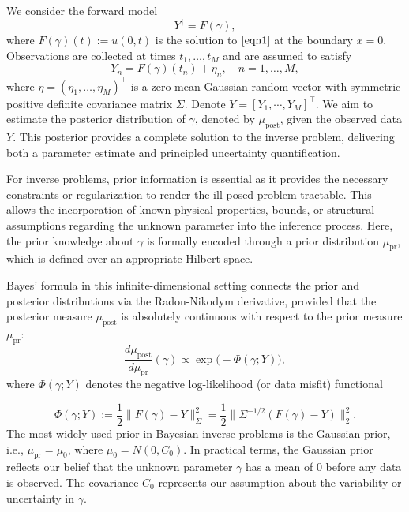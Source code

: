 \documentclass{ws-mplb}
\begin{document}
We consider the forward model
\[
Y^{\dagger} = F(\gamma),
\]
where \( F(\gamma)(t) := u(0, t) \) is the solution to $\eqref{eqn1}$ at the boundary $x=0$. 
Observations are collected at times \( t_1, \dots, t_M \) and are assumed to satisfy
\begin{equation}\label{eqndata}
Y_n = F(\gamma)(t_n) + \eta_n,\quad n=1,\dots,M,
\end{equation}
where \( \eta = (\eta_1, \dots, \eta_M)^\top \) is a zero-mean Gaussian random vector with symmetric positive definite covariance matrix \( \Sigma \).
Denote $Y=[Y_1, \cdots, Y_M]^\top $.
We aim to estimate the posterior distribution  of $\gamma$, denoted by $\mu_{\text{post}}$,  given the observed data ${Y}$. This posterior provides a complete solution to the inverse problem, delivering both a parameter estimate and principled uncertainty quantification.

For inverse problems, prior information is essential as it provides the necessary constraints or regularization to render the ill-posed problem tractable. This allows the incorporation of known physical properties, bounds, or structural assumptions regarding the unknown parameter into the inference process. Here, the prior knowledge about $\gamma$ is formally encoded through a prior distribution $\mu_{\text{pr}}$, which is defined over an appropriate Hilbert space.

Bayes' formula in this infinite-dimensional setting connects the prior and posterior distributions via the Radon-Nikodym derivative, provided that the posterior measure \(\mu_{\text{post}}\) is absolutely continuous with respect to the prior measure \(\mu_{\text{pr}}\):
\[
\frac{d\mu_{\text{post}}}{d\mu_{\text{pr}}}(\gamma) \propto \exp\!\bigl( -\Phi(\gamma; Y) \bigr),
\]
where \(\Phi(\gamma; Y)\) denotes the negative log-likelihood (or data misfit) functional

\[
\Phi(\gamma; Y) := \frac{1}{2} \| F(\gamma) - Y \|_\Sigma^2 = \frac{1}{2} \| \Sigma^{-1/2} (F(\gamma) - Y) \|_2^2.
\]
The most widely used prior in Bayesian inverse problems is the Gaussian prior, i.e., $\mu_{\text{pr}} = \mu_0$, where $\mu_0 = N(0, C_0)$. In practical terms, the Gaussian prior reflects our belief that the unknown parameter $\gamma$ has a mean of 0 before any data is observed. The covariance $C_0$ represents our assumption about the variability or uncertainty in $\gamma$.
\end{document}
